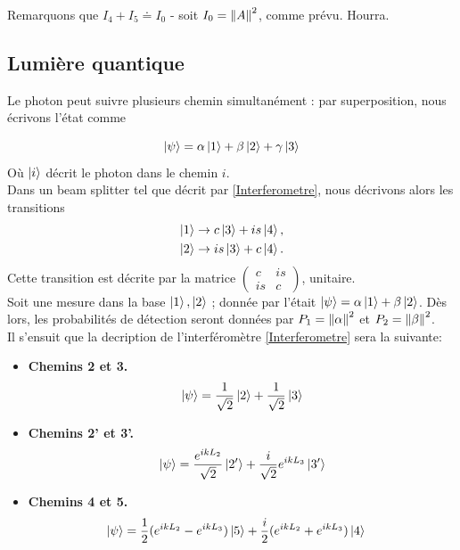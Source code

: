 \documentclass[../notesdecours.tex]{subfiles}
\begin{document}
Remarquons que $I_4+I_5 \doteq I_{0}$ - soit $I_0 = \norm{A}^2$, comme prévu. Hourra.

\subsection{Lumière quantique}

Le photon peut suivre plusieurs chemin simultanément : par superposition, nous écrivons l'état comme

\begin{equation}
    \ket{\psi} = \alpha\ket{1}+\beta\ket{2}+\gamma\ket{3}
\end{equation}
Où $\ket{i}$ décrit le photon dans le chemin $i$.\\

Dans un beam splitter tel que décrit par \eqref{Interferometre}, nous décrivons alors les transitions
\begin{align}
    \ket{1} &\rightarrow c\ket{3} + is\ket{4},\\
    \ket{2} &\rightarrow is\ket{3} + c\ket{4}.
\end{align}
Cette transition est décrite par la matrice  $\begin{pmatrix}
c & is\\
is & c
\end{pmatrix}$, unitaire.\\

Soit une mesure dans la base $\ket{1},\ket{2}$ ; donnée par l'était $\ket{\psi} = \alpha\ket{1}+\beta\ket{2}$. Dès lors, les probabilités de détection seront données par $P_1 = \norm{\alpha}^2$ et $P_2 = \norm{\beta}^2$.\\

Il s'ensuit que la decription de l'interféromètre \ref{Interferometre} sera la suivante:

\begin{itemize}
    \item \textbf{Chemins 2 et 3.}
        \begin{equation}
            \ket{\psi} = \frac{1}{\sqrt{2}}\ket{2} + \frac{1}{\sqrt{2}}\ket{3}
        \end{equation}
    \item \textbf{Chemins 2' et 3'.}
        \begin{align}
            \ket{\psi} &= \frac{e^{ikL_2}}{\sqrt{2}}\ket{2'} + \frac{i}{\sqrt{2}}e^{ikL_3}\ket{3'}\\
        \end{align}
    \item \textbf{Chemins 4 et 5.}
        \begin{align}
            \ket{\psi} &= \frac{1}{2} (e^{ikL_2} - e^{ikL_3})\ket{5} + \frac{i}{2}(e^{ikL_2} + e^{ikL_3})\ket{4}
        \end{align}
\end{itemize}
\end{document}
